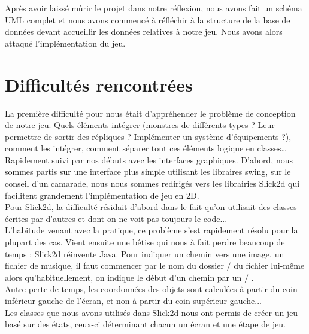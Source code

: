 \documentclass[a4paper,titlepage]{article}
\begin{document}
Après avoir laissé mûrir le projet dans notre réflexion, nous avons fait un schéma UML complet et nous avons commencé à réfléchir à la structure de la base de données devant accueillir les données relatives à notre jeu. Nous avons alors attaqué l’implémentation du jeu.	
\clearpage
	
	\section{Difficultés rencontrées}
	La première difficulté pour nous était d’appréhender le problème de conception de notre jeu. Quels éléments intégrer (monstres de différents types ? Leur permettre de sortir des répliques ? Implémenter un système d’équipements ?), comment les intégrer, comment séparer tout ces éléments logique en classes…\\
	
Rapidement suivi par nos débuts avec les interfaces graphiques. D’abord, nous sommes partis sur une interface plus simple utilisant les libraires swing, sur le conseil d’un camarade, nous nous sommes redirigés vers les librairies Slick2d qui facilitent grandement l’implémentation de jeu en 2D.\\

Pour Slick2d, la difficulté résidait d’abord dans le fait qu’on utilisait des classes écrites par d’autres et dont on ne voit pas toujours le code...\\ L’habitude venant avec la pratique, ce problème s’est rapidement résolu pour la plupart des cas. Vient ensuite une bêtise qui nous à fait perdre beaucoup de temps : Slick2d \og réinvente \fg{} Java. Pour indiquer un chemin vers une image, un fichier de musique, il faut commencer par le nom du dossier $/$ du fichier lui-même alors qu'habituellement, on indique le début d’un chemin par un \og $/$ \fg{}. \\

Autre perte de temps, les coordonnées des objets sont calculées à partir du coin inférieur gauche de l’écran, et non à partir du coin supérieur gauche...\\

Les classes que nous avons utilisés dans Slick2d nous ont permis de créer un jeu basé sur des états, ceux-ci déterminant chacun un écran et une étape de jeu.
\end{document}

